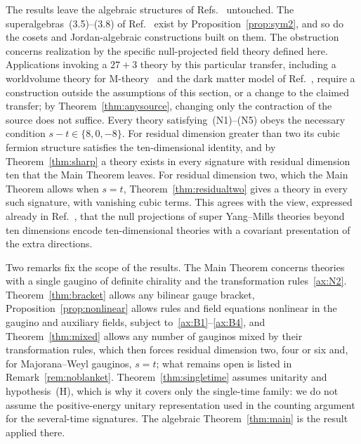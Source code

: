 The results leave the algebraic structures of Refs.~\cite{RiosMarraniChester2019,TruiniMarraniRiosdeGraaf2025,MarraniRiosChester2023} untouched. The superalgebras~(3.5)--(3.8) of Ref.~\cite{RiosMarraniChester2019} exist by Proposition~\ref{prop:sym2}, and so do the cosets and Jordan-algebraic constructions built on them. The obstruction concerns realization by the specific null-projected field theory defined here. Applications invoking a $27+3$ theory by this particular transfer, including a worldvolume theory for M-theory~\cite{RiosMarraniChester2020} and the dark matter model of Ref.~\cite{PaduroiuRiosMarraniChester2021}, require a construction outside the assumptions of this section, or a change to the claimed transfer; by Theorem~\ref{thm:anysource}, changing only the contraction of the source does not suffice. Every theory satisfying~(N1)--(N5) obeys the necessary condition $s-t\in\{8,0,-8\}$. For residual dimension greater than two its cubic fermion structure satisfies the ten-dimensional identity, and by Theorem~\ref{thm:sharp} a theory exists in every signature with residual dimension ten that the Main Theorem leaves. For residual dimension two, which the Main Theorem allows when $s=t$, Theorem~\ref{thm:residualtwo} gives a theory in every such signature, with vanishing cubic terms. This agrees with the view, expressed already in Ref.~\cite{RudychevSezginSundell1998}, that the null projections of super Yang--Mills theories beyond ten dimensions encode ten-dimensional theories with a covariant presentation of the extra directions.

Two remarks fix the scope of the results. The Main Theorem concerns theories with a single gaugino of definite chirality and the transformation rules~\ref{ax:N2}. Theorem~\ref{thm:bracket} allows any bilinear gauge bracket, Proposition~\ref{prop:nonlinear} allows rules and field equations nonlinear in the gaugino and auxiliary fields, subject to~\ref{ax:B1}--\ref{ax:B4}, and Theorem~\ref{thm:mixed} allows any number of gauginos mixed by their transformation rules, which then forces residual dimension two, four or six and, for Majorana--Weyl gauginos, $s=t$; what remains open is listed in Remark~\ref{rem:noblanket}. Theorem~\ref{thm:singletime} assumes unitarity and hypothesis~(H), which is why it covers only the single-time family: we do not assume the positive-energy unitary representation used in the counting argument for the several-time signatures. The algebraic Theorem~\ref{thm:main} is the result applied there.

